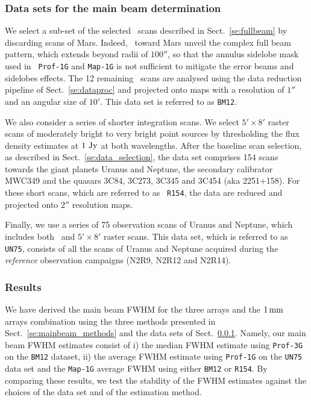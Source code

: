 \subsubsection{Data sets for the main beam determination}
\label{se:mainbeam_dataset}

We select a sub-set of the selected \bm\ scans described in
Sect.~\ref{se:fullbeam} by discarding scans of Mars. {\lp Indeed, \bms\
toward Mars unveil the complex full beam pattern, which extends beyond
radii of $100''$, so that the annulus sidelobe mask used in {\tt
Prof-1G} and {\tt Map-1G} is not sufficient to mitigate the error
beams and sidelobes effects.}
The 12 remaining \bm\ scans are analysed using the data reduction
pipeline of Sect.~\ref{se:dataproc} and projected onto maps
with a resolution of $1''$ and an angular size of $10'$. This data set
is referred to as {\tt BM12}.

We also consider a series of shorter integration scans. We select
$5' \times 8'$ raster scans of moderately bright to very bright point
sources by thresholding the flux density estimates at $1~\rm{Jy}$ at both
wavelengths. %
After the baseline scan selection, as described in
Sect.~\ref{se:data_selection}, the data set comprises 154 %
scans towards the giant planets Uranus and Neptune, the secondary calibrator
MWC349 and the quasars 3C84, 3C273, 3C345 and 3C454 (aka
2251+158). For these short scans, which are referred to as {\tt
R154}, the data are reduced and projected onto $2''$
resolution maps. 

{\lp Finally, we use a series of 75 observation scans of Uranus and
Neptune, which includes both \bm\ and $5' \times 8'$ raster scans. 
This data set, which is referred to as {\tt UN75}, consists of all the
scans of Uranus and Neptune acquired during the \emph{reference}
observation campaigns (N2R9, N2R12 and N2R14).}


\subsubsection{Results}
\label{se:mainbeam_results}

We have derived the main beam FWHM for the three arrays and the
$1\,\rm{mm}$ arrays combination using the three methods presented in
Sect.~\ref{se:mainbeam_methods} and the data
sets of Sect.~\ref{se:mainbeam_dataset}.
Namely, our main beam FWHM estimates
consist of i) the median FWHM estimate using {\tt Prof-3G} on the
{\tt BM12} dataset, ii) the average FWHM estimate using {\tt Prof-1G}
on the {\tt UN75} data set and the {\tt Map-1G} average FWHM using
either {\tt BM12} or {\tt R154}. 
By comparing these results, we test the stability of the FWHM
estimates against the choices of the data set and of the estimation
method. %

